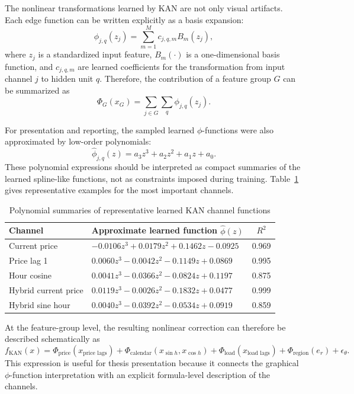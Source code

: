 \documentclass[10pt,conference,onecolumn]{IEEEtran}
\begin{document}
The nonlinear transformations learned by KAN are not only visual artifacts. Each edge function can be written explicitly as a basis expansion:
\begin{equation}
\phi_{j,q}(z_j) = \sum_{m=1}^{M} c_{j,q,m} B_m(z_j),
\end{equation}
where $z_j$ is a standardized input feature, $B_m(\cdot)$ is a one-dimensional basis function, and $c_{j,q,m}$ are learned coefficients for the transformation from input channel $j$ to hidden unit $q$. Therefore, the contribution of a feature group $G$ can be summarized as
\begin{equation}
\Phi_G(x_G) = \sum_{j \in G} \sum_{q} \phi_{j,q}(z_j).
\end{equation}

For presentation and reporting, the sampled learned $\phi$-functions were also approximated by low-order polynomials:
\begin{equation}
\hat{\phi}_{j,q}(z) = a_3 z^3 + a_2 z^2 + a_1 z + a_0.
\end{equation}
These polynomial expressions should be interpreted as compact summaries of the learned spline-like functions, not as constraints imposed during training. Table~\ref{tab:phi_formula_summary} gives representative examples for the most important channels.

\begin{table}[t]
\centering
\caption{Polynomial summaries of representative learned KAN channel functions}
\label{tab:phi_formula_summary}
\small
\begin{tabular}{llc}
\toprule
Channel & Approximate learned function $\hat{\phi}(z)$ & $R^2$ \\
\midrule
Current price &
$-0.0106z^3 + 0.0179z^2 + 0.1462z - 0.0925$ & 0.969 \\
Price lag 1 &
$0.0060z^3 - 0.0042z^2 - 0.1149z + 0.0869$ & 0.995 \\
Hour cosine &
$0.0041z^3 - 0.0366z^2 - 0.0824z + 0.1197$ & 0.875 \\
Hybrid current price &
$0.0119z^3 - 0.0026z^2 - 0.1832z + 0.0477$ & 0.999 \\
Hybrid sine hour &
$0.0040z^3 - 0.0392z^2 - 0.0534z + 0.0919$ & 0.859 \\
\bottomrule
\end{tabular}
\end{table}

At the feature-group level, the resulting nonlinear correction can therefore be described schematically as
\begin{equation}
f_{\text{KAN}}(x) =
\Phi_{\text{price}}(x_{\text{price lags}}) +
\Phi_{\text{calendar}}(x_{\sin h},x_{\cos h}) +
\Phi_{\text{load}}(x_{\text{load lags}}) +
\Phi_{\text{region}}(e_r) +
\epsilon_{\theta}.
\end{equation}
This expression is useful for thesis presentation because it connects the graphical $\phi$-function interpretation with an explicit formula-level description of the channels.
\end{document}
